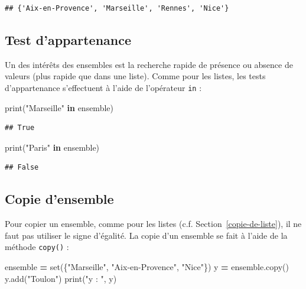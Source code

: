 \documentclass[12pt,]{book}
\newenvironment{Shaded}{\begin{snugshade}}{\end{snugshade}}
\newcommand{\KeywordTok}[1]{\textcolor[rgb]{0.13,0.29,0.53}{\textbf{#1}}}
\newcommand{\StringTok}[1]{\textcolor[rgb]{0.31,0.60,0.02}{#1}}
\newcommand{\OperatorTok}[1]{\textcolor[rgb]{0.81,0.36,0.00}{\textbf{#1}}}
\newcommand{\BuiltInTok}[1]{#1}
\newcommand{\NormalTok}[1]{#1}
\numberwithin{equation}{section}
\numberwithin{countremarque}{section}
\begin{document}
\begin{lstlisting}
## {'Aix-en-Provence', 'Marseille', 'Rennes', 'Nice'}
\end{lstlisting}

\subsection{Test d'appartenance}\label{test-dappartenance-1}

Un des intérêts des ensembles est la recherche rapide de présence ou
absence de valeurs (plus rapide que dans une liste). Comme pour les
listes, les tests d'appartenance s'effectuent à l'aide de l'opérateur
\texttt{in} :

\begin{Shaded}
\begin{Highlighting}[]
\BuiltInTok{print}\NormalTok{(}\StringTok{"Marseille"} \KeywordTok{in}\NormalTok{ ensemble)}
\end{Highlighting}
\end{Shaded}

\begin{lstlisting}
## True
\end{lstlisting}

\begin{Shaded}
\begin{Highlighting}[]
\BuiltInTok{print}\NormalTok{(}\StringTok{"Paris"} \KeywordTok{in}\NormalTok{ ensemble)}
\end{Highlighting}
\end{Shaded}

\begin{lstlisting}
## False
\end{lstlisting}

\subsection{Copie d'ensemble}\label{copie-densemble}

Pour copier un ensemble, comme pour les listes (c.f.
Section~\ref{copie-de-liste}), il ne faut pas utiliser le signe
d'égalité. La copie d'un ensemble se fait à l'aide de la méthode
\texttt{copy()} :

\begin{Shaded}
\begin{Highlighting}[]
\NormalTok{ensemble }\OperatorTok{=} \BuiltInTok{set}\NormalTok{(\{}\StringTok{"Marseille"}\NormalTok{, }\StringTok{"Aix-en-Provence"}\NormalTok{, }\StringTok{"Nice"}\NormalTok{\})}
\NormalTok{y }\OperatorTok{=}\NormalTok{ ensemble.copy()}
\NormalTok{y.add(}\StringTok{"Toulon"}\NormalTok{)}
\BuiltInTok{print}\NormalTok{(}\StringTok{"y : "}\NormalTok{, y)}
\end{Highlighting}
\end{Shaded}
\end{document}
